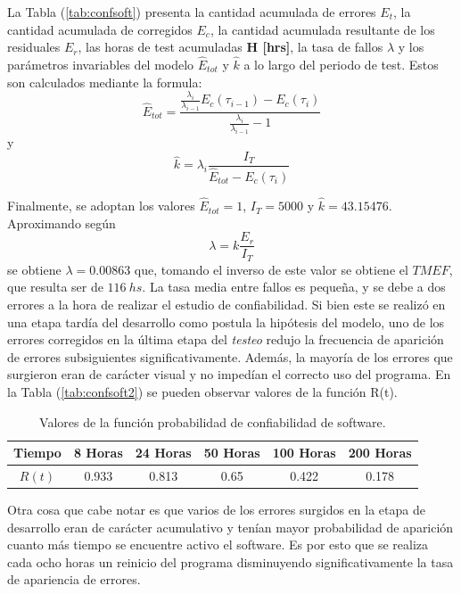 La Tabla (\ref{tab:confsoft}) presenta la cantidad acumulada de errores $E_t$, la cantidad acumulada de corregidos $E_c$, la cantidad acumulada resultante de los residuales $E_r$, las horas de test acumuladas \textbf{H [hrs]}, la tasa de fallos $\lambda$ y los parámetros invariables del modelo $\hat{E}_{tot}$ y $\hat{k}$ a lo largo del periodo de test. Estos son calculados mediante la formula:
\begin{equation}
	\hat{E}_{tot} = \frac{ \frac{\lambda_i}{\lambda_{i-1}} E_c(\tau_{i-1})-E_c(\tau_i)}{\frac{\lambda_i}{\lambda_{i-1}}-1}
\end{equation}
y
\begin{equation}
	\hat{k} = \lambda_i\frac{I_T}{\hat{E}_{tot}-E_c(\tau_i)}
\end{equation}

Finalmente, se adoptan los valores $\hat{E}_{tot} = 1$, $I_T = 5000$  y $\hat{k} = 43.15476$. Aproximando según
\begin{equation}
	\lambda = k\frac{E_r}{I_T}
\end{equation}
se obtiene $\lambda = 0.00863$ que, tomando el inverso de este valor se obtiene el $TMEF$, que resulta ser de $116 \ hs$. La tasa media entre fallos es pequeña, y se debe a dos errores a la hora de realizar el estudio de confiabilidad. Si bien este se realizó en una etapa tardía del desarrollo como postula la hipótesis del modelo, uno de los errores corregidos en la última etapa del \textit{testeo} redujo la frecuencia de aparición de errores subsiguientes significativamente. Además, la mayoría de los errores que surgieron eran de carácter visual y no impedían el correcto uso del programa. En la Tabla (\ref{tab:confsoft2}) se pueden observar valores de la función R(t).

\begin{table}[H]
\centering
\begin{tabular}{|c|c|c|c|c|c|}
\hline
\textbf{Tiempo} & \textbf{8 Horas} & \textbf{24 Horas} & \textbf{50 Horas} & \textbf{100 Horas} & \textbf{200 Horas} \\ \hline
$R(t)$          & 0.933            & 0.813             & 0.65              & 0.422              & 0.178              \\ \hline
\end{tabular}
\caption{Valores de la función probabilidad de confiabilidad de software.}
\label{probConf}
\end{table}

Otra cosa que cabe notar es que varios de los errores surgidos en la etapa de desarrollo eran de carácter acumulativo y tenían mayor probabilidad de aparición cuanto más tiempo se encuentre activo el software. Es por esto que se realiza cada ocho horas un reinicio del programa disminuyendo significativamente la tasa de apariencia de errores.

%
